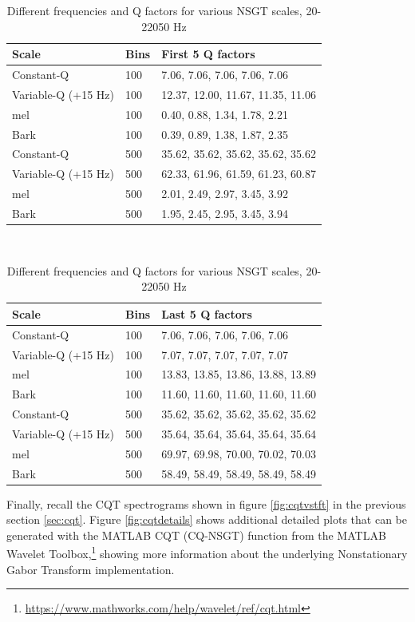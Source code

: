 \documentclass[report.tex]{subfiles}
\begin{document}
\begin{table}[ht]
\begin{tabular}{ |l|l|p{9cm}| }
	 \hline
	 Scale & Bins & First 5 Q factors \\
	 \hline
	 \hline
	 Constant-Q & 100 & 7.06, 7.06, 7.06, 7.06, 7.06  \\
	 \hline
	 Variable-Q (+15 Hz) & 100 & 12.37, 12.00, 11.67, 11.35, 11.06 \\
	 \hline
	 mel & 100 & 0.40, 0.88, 1.34, 1.78, 2.21 \\
	 \hline
	 Bark & 100 & 0.39, 0.89, 1.38, 1.87, 2.35 \\
	 \hline
	 Constant-Q & 500 & 35.62, 35.62, 35.62, 35.62, 35.62 \\
	 \hline
	 Variable-Q (+15 Hz) & 500 & 62.33, 61.96, 61.59, 61.23, 60.87 \\
	 \hline
	 mel & 500 & 2.01, 2.49, 2.97, 3.45, 3.92 \\
	 \hline
	 Bark & 500 & 1.95, 2.45, 2.95, 3.45, 3.94 \\
	 \hline
\end{tabular}\\
\vspace{1em}
\begin{tabular}{ |l|l|p{9cm}| }
	 \hline
	 Scale & Bins & Last 5 Q factors \\
	 \hline
	 \hline
	 Constant-Q & 100 & 7.06, 7.06, 7.06, 7.06, 7.06  \\
	 \hline
	 Variable-Q (+15 Hz) & 100 & 7.07, 7.07, 7.07, 7.07, 7.07 \\
	 \hline
	 mel & 100 & 13.83, 13.85, 13.86, 13.88, 13.89 \\
	 \hline
	 Bark & 100 & 11.60, 11.60, 11.60, 11.60, 11.60 \\
	 \hline
	 Constant-Q & 500 & 35.62, 35.62, 35.62, 35.62, 35.62 \\
	 \hline
	 Variable-Q (+15 Hz) & 500 & 35.64, 35.64, 35.64, 35.64, 35.64 \\
	 \hline
	 mel & 500 & 69.97, 69.98, 70.00, 70.02, 70.03 \\
	 \hline
	 Bark & 500 & 58.49, 58.49, 58.49, 58.49, 58.49 \\
	 \hline
\end{tabular}
	\caption{Different frequencies and Q factors for various NSGT scales, 20-22050 Hz}
	\label{table:nsgtfreqsandqs}
\end{table}

\newpagefill

Finally, recall the CQT spectrograms shown in figure \ref{fig:cqtvstft} in the previous section \ref{sec:cqt}. Figure \ref{fig:cqtdetails} shows additional detailed plots that can be generated with the MATLAB CQT (CQ-NSGT) function from the MATLAB Wavelet Toolbox,\footnote{\url{https://www.mathworks.com/help/wavelet/ref/cqt.html}} showing more information about the underlying Nonstationary Gabor Transform implementation.
\end{document}
